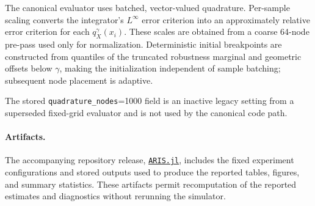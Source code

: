 The canonical evaluator uses batched, vector-valued quadrature. Per-sample scaling converts the integrator's $L^\infty$ error criterion into an approximately relative error criterion for each $q_X^\gamma(x_i)$. These scales are obtained from a coarse 64-node pre-pass used only for normalization. Deterministic initial breakpoints are constructed from quantiles of the truncated robustness marginal and geometric offsets below $\gamma$, making the initialization independent of sample batching; subsequent node placement is adaptive.

The stored \texttt{quadrature\_nodes}=1000 field is an inactive legacy setting from a superseded fixed-grid evaluator and is not used by the canonical code path.

\paragraph{Artifacts.}
The accompanying repository release, \href{https://github.com/sisl/ARIS.jl}{\texttt{ARIS.jl}}, includes the fixed experiment configurations and stored outputs used to produce the reported tables, figures, and summary statistics. These artifacts permit recomputation of the reported estimates and diagnostics without rerunning the simulator.